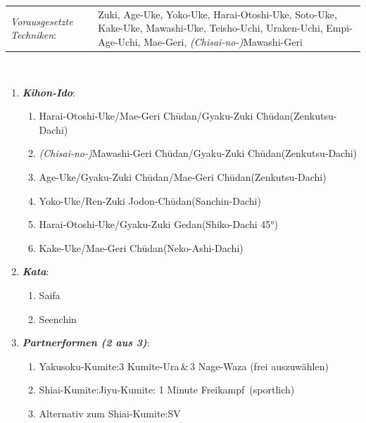 \documentclass[a5paper,landscape,DIV=calc,11pt,notitlepage]{scrartcl}
\begin{document}
\pagebreak
\begin{tcolorbox}[colback=white,colframe=BLBELT,coltitle=white,title=4. Kyu: Blau]
	\renewcommand{\labelenumi}{\alph{enumi}.)}
	\renewcommand{\labelenumii}{\arabic*.}
	{\scriptsize
		\begin{tabularx}{\textwidth}{lX}
			\textit{Vorausgesetzte Techniken}:& Zuki, Age-Uke, Yoko-Uke, Harai-Otoshi-Uke, Soto-Uke, Kake-Uke, Mawashi-Uke, Teisho-Uchi, Uraken-Uchi, \mbox{Empi-Age-Uchi}, Mae-Geri, \textit{(Chisai-no-)}Mawashi-Geri
		\end{tabularx}\\}
	\begin{enumerate}[nosep]
		\item \textit{\textbf{Kihon-Ido}}:
		\begin{enumerate}[nosep]
			\item Harai-Otoshi-Uke/Mae-Geri Ch\={u}dan/Gyaku-Zuki Ch\={u}dan\tabto{280pt}(Zenkutsu-Dachi)
			\item \textit{(Chisai-no-)}Mawashi-Geri Ch\={u}dan/Gyaku-Zuki Ch\={u}dan\tabto{280pt}(Zenkutsu-Dachi)
			\item Age-Uke/Gyaku-Zuki Ch\={u}dan/Mae-Geri Ch\={u}dan\tabto{280pt}(Zenkutsu-Dachi)
			\item Yoko-Uke/Ren-Zuki Jodon-Ch\={u}dan\tabto{280pt}(Sanchin-Dachi)
			\item Harai-Otoshi-Uke/Gyaku-Zuki Gedan\tabto{280pt}(Shiko-Dachi 45°)
			\item Kake-Uke/Mae-Geri Ch\={u}dan\tabto{280pt}(Neko-Ashi-Dachi)
		\end{enumerate}
		\item \textit{\textbf{Kata}}:
		\begin{enumerate}[nosep]
			\item Saifa
			\item Seenchin
		\end{enumerate}
		\item \textit{\textbf{Partnerformen (2 aus 3)}}:
		\begin{enumerate}[nosep]
			\item Yakusoku-Kumite:\tabto{200pt}3 Kumite-Ura\,\&\,3 Nage-Waza (frei auszuwählen)
			\item Shiai-Kumite:\tabto{200pt}Jiyu-Kumite: 1 Minute \frqq Freikampf\flqq~(sportlich)
			\item Alternativ zum Shiai-Kumite:\tabto{200pt}SV
		\end{enumerate}
	\end{enumerate}
\end{tcolorbox}
\end{document}
